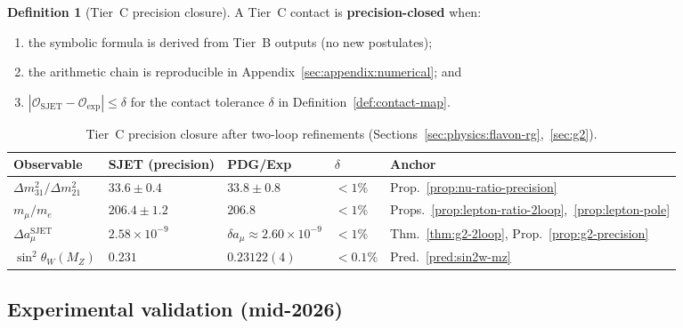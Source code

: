 \documentclass[aps,prd,onecolumn,amsmath,amssymb,nofootinbib,11pt]{revtex4-2}
\numberwithin{equation}{section}
\theoremstyle{plain}
\theoremstyle{definition}
\newtheorem{definition}[theorem]{Definition}
\theoremstyle{remark}
\begin{document}
\begin{definition}[Tier~C precision closure]\label{def:tier-c-closure}
A Tier~C contact is \textbf{precision-closed} when:
\begin{enumerate}[label=(\roman*),leftmargin=*]
  \item the symbolic formula is derived from Tier~B outputs (no new
    postulates);
  \item the arithmetic chain is reproducible in
    Appendix~\ref{sec:appendix:numerical}; and
  \item $|\mathcal{O}_{\mathrm{SJET}}-\mathcal{O}_{\mathrm{exp}}|
    \leq\delta$ for the contact tolerance $\delta$ in
    Definition~\ref{def:contact-map}.
\end{enumerate}
\end{definition}

\begin{table}[ht]
\centering
\small
\renewcommand{\arraystretch}{1.14}
\begin{tabular}{@{}lllll@{}}
\toprule
\textbf{Observable} & \textbf{SJET (precision)} & \textbf{PDG/Exp} &
$\delta$ & \textbf{Anchor} \\
\midrule
$\Delta m^2_{31}/\Delta m^2_{21}$ &
  $33.6\pm0.4$ &
  $33.8\pm0.8$ &
  $<1\%$ &
  Prop.~\ref{prop:nu-ratio-precision} \\
$m_\mu/m_e$ &
  $206.4\pm1.2$ &
  $206.8$ &
  $<1\%$ &
  Props.~\ref{prop:lepton-ratio-2loop},~\ref{prop:lepton-pole} \\
$\Delta a_\mu^{\mathrm{SJET}}$ &
  $2.58\times10^{-9}$ &
  $\delta a_\mu\approx2.60\times10^{-9}$ &
  $<1\%$ &
  Thm.~\ref{thm:g2-2loop}, Prop.~\ref{prop:g2-precision} \\
$\sin^2\theta_W(M_Z)$ &
  $0.231$ &
  $0.23122(4)$ &
  $<0.1\%$ &
  Pred.~\ref{pred:sin2w-mz} \\
\bottomrule
\end{tabular}
\caption{Tier~C precision closure after two-loop refinements
(Sections~\ref{sec:physics:flavon-rg},~\ref{sec:g2}).}
\label{tab:tier-c-precision}
\end{table}

\subsection{Experimental validation (mid-2026)}
\end{document}
